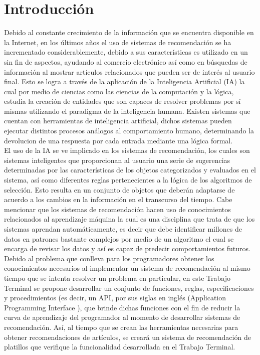 \chapter{Introducción}
Debido al constante crecimiento de la información que se encuentra disponible en la Internet, en los últimos años el uso de sistemas de recomendación se ha incrementado considerablemente, debido a sus características es utilizado en un sin fin de aspectos, ayudando al comercio electrónico así como en búsquedas de información al mostrar artículos relacionados que pueden ser de interés al usuario final. Esto se logra a través de la aplicación de la Inteligencia Artificial (IA) la cual por medio de ciencias como las ciencias de la computación y la lógica, estudia la creación de entidades que son capaces de resolver problemas por sí mismas utilizando el paradigma de la inteligencia humana. Existen sistemas que cuentan con herramientas de inteligencia artificial, dichos sistemas pueden ejecutar distintos procesos análogos al comportamiento humano, determinando la devolucion de una respuesta por cada entrada mediante una lógica formal. \cite{1}\\

El uso de la IA se ve implicado en los sistemas de recomendación, los cuales son sistemas inteligentes que proporcionan al usuario una serie de sugerencias determinadas por las características de los objetos categorizados y evaluados en el sistema, así como diferentes reglas pertenecientes a la lógica de los algoritmos de selección. Esto resulta en un conjunto de objetos que deberán adaptarse de acuerdo a los cambios en la información en el transcurso del tiempo. Cabe mencionar que los sistemas de recomendación hacen uso de conocimientos relacionados al aprendizaje máquina la cual es una disciplina que trata de que los sistemas aprendan automáticamente, es decir que debe identificar millones de datos en patrones bastante complejos por medio de un algoritmo el cual se encarga de revisar los datos y así es capaz de predecir comportamientos futuros. \cite{2}\\

Debido al problema que conlleva para los programadores obtener los conocimientos necesarios al implementar un sistema de recomendación al mismo tiempo que se intenta resolver un problema en particular, en este Trabajo Terminal se propone desarrollar un conjunto de funciones, reglas, especificaciones y procedimientos (es decir, un API, por sus siglas en inglés (Application Programming Interface ), que brinde dichas funciones con el fin de reducir la curva de aprendizaje del programador al momento de desarrollar sistemas de recomendación. \cite{3} Así, al tiempo que se crean las herramientas necesarias para obtener recomendaciones de artículos, se creará un sistema de recomendación de platillos que verifique la funcionalidad desarrollada en el Trabajo Terminal. 